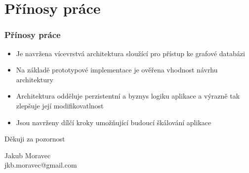 \documentclass{beamer}
\begin{document}
\section{Přínosy práce}
\begin{frame}
\frametitle{Přínosy práce}
\begin{itemize}
\item Je navržena vícevrstvá architektura sloužící pro přístup ke grafové databázi
\item Na základě prototypové implementace je ověřena vhodnost návrhu architektury
\item Architektura odděluje perzistentní a byznys logiku aplikace a výrazně tak zlepšuje její modifikovatlnost
\item Jsou navrženy dílčí kroky umožňující budoucí škálování aplikace
\end{itemize}
\end{frame}
\begin{frame}
   \centering\Large Děkuji za pozornost
   \vspace{2em}

   \centering\normalsize
   Jakub Moravec\\ jkb.moravec@gmail.com
\end{frame}
\end{document}
